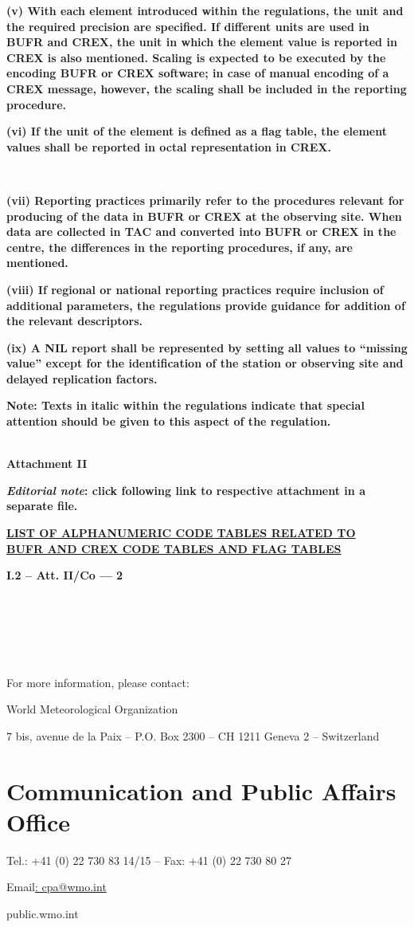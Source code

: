 \textbf{(v) With each element introduced within the regulations, the unit and the required precision are specified. If different units are used in BUFR and CREX, the unit in which the element value is reported in CREX is also mentioned. Scaling is expected to be executed by the encoding BUFR or CREX software; in case of manual encoding of a CREX message, however, the scaling shall be included in the reporting procedure.}

\textbf{(vi) If the unit of the element is defined as a flag table, the element values shall be reported in octal representation in CREX.}

\textbf{\\
}

\textbf{(vii) Reporting practices primarily refer to the procedures relevant for producing of the data in BUFR or CREX at the observing site. When data are collected in TAC and converted into BUFR or CREX in the centre, the differences in the reporting procedures, if any, are mentioned.}

\textbf{(viii) If regional or national reporting practices require inclusion of additional parameters, the regulations provide guidance for addition of the relevant descriptors.}

\textbf{(ix) A NIL report shall be represented by setting all values to ``missing value'' except for the identification of the station or observing site and delayed replication factors.}

\textbf{Note: Texts in italic within the regulations indicate that special attention should be given to this aspect of the regulation.}

\textbf{\\
Attachment II}

\textbf{\emph{Editorial note}: click following link to respective attachment in a separate file.}

\href{WMO306_vI2_PartC_att2_en.pdf}{\textbf{LIST OF ALPHANUMERIC CODE TABLES RELATED TO\\
BUFR AND CREX CODE TABLES AND FLAG TABLES}}

\textbf{I.2 -- Att. II/Co ---} \textbf{2}

\textbf{\\
}

\textbf{~\\
}

\textbf{~\\
}

For more information, please contact:

World Meteorological Organization

7 bis, avenue de la Paix -- P.O. Box 2300 -- CH 1211 Geneva 2 -- Switzerland

\hypertarget{communication-and-public-affairs-office}{%
\section{Communication and Public Affairs Office}\label{communication-and-public-affairs-office}}

Tel.: +41 (0) 22 730 83 14/15 -- Fax: +41 (0) 22 730 80 27

Email\href{mailto::\%20cpa@wmo.int}{: cpa@wmo.int}

public.wmo.int
